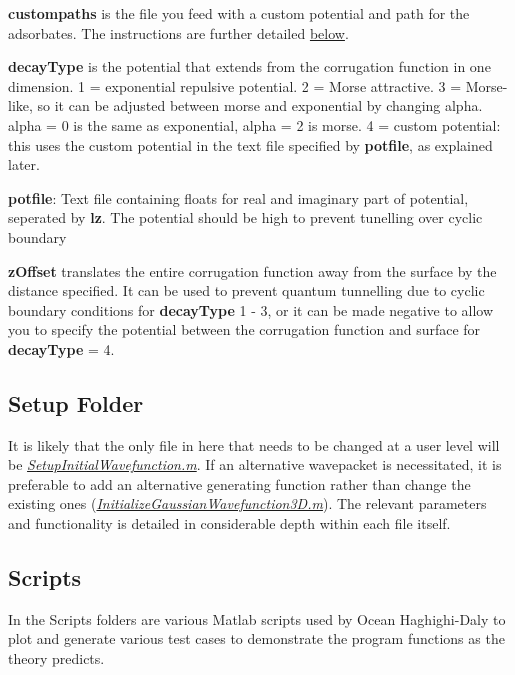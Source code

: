 \documentclass[11pt,letterpaper]{article}
\renewcommand{\\}{\bigskip}
\begin{document}
\textbf{custompaths} is the file you feed with a custom potential and path for the adsorbates. The instructions are further detailed \hyperref[sec:custompaths]{below}.\\


\textbf{decayType} is the potential that extends from the corrugation function in one dimension. 1 = exponential repulsive potential. 2 = Morse attractive. 3 = Morse-like, so it can be adjusted between morse and exponential by changing alpha. alpha = 0 is the same as exponential, alpha = 2 is morse. 4 = custom potential: this uses the custom potential in the text file specified by \textbf{potfile}, as explained later.\\

    
\textbf{potfile}: Text file containing floats for real and imaginary part of potential, seperated by \textbf{lz}. The potential should be high to prevent tunelling over cyclic boundary\\


\textbf{zOffset} translates the entire corrugation function away from the surface by the distance specified. It can be used to prevent quantum tunnelling due to cyclic boundary conditions for \textbf{decayType} 1 - 3, or it can be made negative to allow you to specify the potential between the corrugation function and surface for
\textbf{decayType} = 4.\\

\subsection{Setup Folder}

It is likely that the only file in here that needs to be changed at a user level will be \textit{\ul{SetupInitialWavefunction.m}}. If an alternative wavepacket is necessitated, it is preferable to add an alternative generating function rather than change the existing ones (\textit{\ul{InitializeGaussianWavefunction3D.m}}). The relevant parameters and functionality is detailed in considerable depth within each file itself.


\subsection{Scripts}

In the Scripts folders are various Matlab scripts used by Ocean Haghighi-Daly to plot and generate various test cases to demonstrate the program functions as the theory predicts.\\
\end{document}
